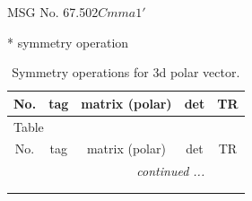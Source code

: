 \documentclass[fleqn,8pt]{jsarticle}
\begin{document}
\setcounter{MaxMatrixCols}{32}

\renewcommand{\tablename}{Table~}
\renewcommand{\figurename}{Figure~}
\begin{center}
\LARGE
MSG No. 67.502\quad$Cmma1'$
\end{center}
* symmetry operation
\renewcommand{\arraystretch}{1.3}
\begin{longtable}{ccccc}
\caption{Symmetry operations for 3d polar vector.}
 \\
 \hline \hline
No. & tag & matrix (polar) & det & TR \\ \hline \endfirsthead

\multicolumn{4}{l}{\tablename\ \thetable{}} \\
 \hline \hline
No. & tag & matrix (polar) & det & TR \\ \hline \endhead

 \hline \hline
\multicolumn{4}{r}{\footnotesize\it continued ...} \\ \endfoot

 \hline \hline
\multicolumn{4}{r}{} \\ \endlastfoot


\end{longtable}
\end{document}

